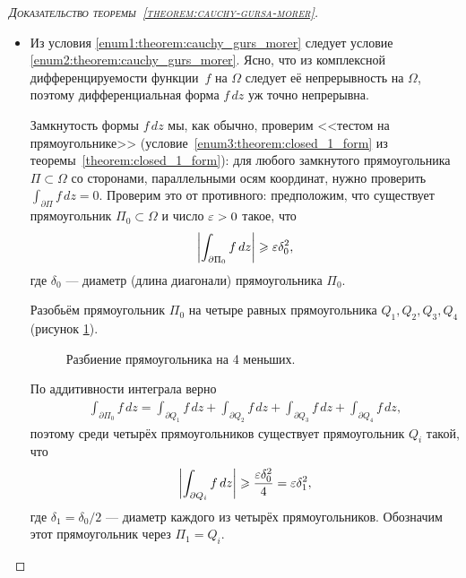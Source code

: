 \documentclass[../complex-analysis.tex]{subfiles}
\begin{document}
\begin{proof}[\normalfont\textsc{Доказательство теоремы~\ref{theorem:cauchy-gursa-morer}}]\
 \begin{itemize}
  \item Из условия \ref{enum1:theorem:cauchy_gurs_morer} следует условие \ref{enum2:theorem:cauchy_gurs_morer}. Ясно, что из комплексной дифференцируемости функции~$ f $ на $ \Omega $ следует её непрерывность на $ \Omega $, поэтому дифференциальная форма $ f\,dz $ уж точно непрерывна.

   Замкнутость формы $ f\,dz $ мы, как обычно, проверим <<тестом на прямоугольнике>> (условие~\ref{enum3:theorem:closed_1_form} из теоремы~\ref{theorem:closed_1_form}): для любого замкнутого прямоугольника $ \Pi \subset\Omega $ со сторонами, параллельными осям координат, нужно проверить $ \int_{\partial\Pi} f\,dz=0  $. Проверим это от противного: предположим, что существует прямоугольник $ \Pi_0 \subset \Omega $ и число $ \varepsilon > 0 $ такое, что
   \begin{align*}
    \left| \int_{\partial\Pi_0} f\,dz   \right| \geqslant \varepsilon \delta_0^{2},
   \end{align*} где $ \delta_0 $ --- диаметр (длина диагонали) прямоугольника $ \Pi_0 $.

   Разобьём прямоугольник $ \Pi_0 $ на четыре равных прямоугольника $ Q_1, Q_2, Q_3, Q_4 $ (рисунок \ref{fig:theorem_cauchy_gurs_morer_rect}).

   \begin{figure}[ht]
    \centering
    \caption{Разбиение прямоугольника на 4 меньших.}
    \label{fig:theorem_cauchy_gurs_morer_rect}
   \end{figure}

   По аддитивности интеграла верно
   \begin{align*}
    \int_{\partial\Pi_0} f\,dz = \int_{\partial Q_1} f\,dz + \int_{\partial Q_2}  f\,dz + \int_{\partial Q_3} f\,dz + \int_{\partial Q_4} f\,dz,  
   \end{align*} поэтому среди четырёх прямоугольников существует прямоугольник $ Q_i $ такой, что
   \begin{align*}
    \left| \int_{\partial Q_i} f\,dz \right| \geqslant \frac{\varepsilon \delta_0^{2}}{4} = \varepsilon \delta_1^{2},
   \end{align*} где $ \delta_1 = \delta_0 / 2 $ --- диаметр каждого из четырёх прямоугольников. Обозначим этот прямоугольник через $ \Pi_1 = Q_i $.


\end{itemize}
\end{proof}
\end{document}

